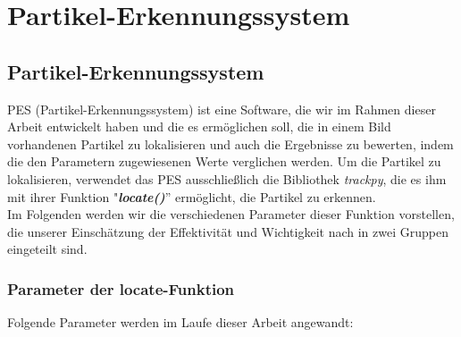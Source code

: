 \chapter{Partikel-Erkennungssystem \label{kap3}}

\section{Partikel-Erkennungssystem}
PES (Partikel-Erkennungssystem)  ist eine Software, die wir im Rahmen dieser Arbeit entwickelt haben und die es ermöglichen soll, die in einem Bild vorhandenen Partikel zu lokalisieren und auch die Ergebnisse zu bewerten, indem die den Parametern zugewiesenen Werte verglichen werden. 
Um die Partikel zu lokalisieren, verwendet das PES ausschließlich die Bibliothek \textit{trackpy}, die es ihm mit ihrer Funktion "\textit{\textbf{locate()}}''  ermöglicht, die Partikel zu erkennen.\\
Im Folgenden werden wir die verschiedenen Parameter dieser Funktion vorstellen, die unserer Einschätzung der Effektivität und Wichtigkeit nach in zwei Gruppen eingeteilt sind.
	\subsection{Parameter der locate-Funktion \label{kap3_param_loacate}}
		Folgende Parameter werden im Laufe dieser Arbeit angewandt:

